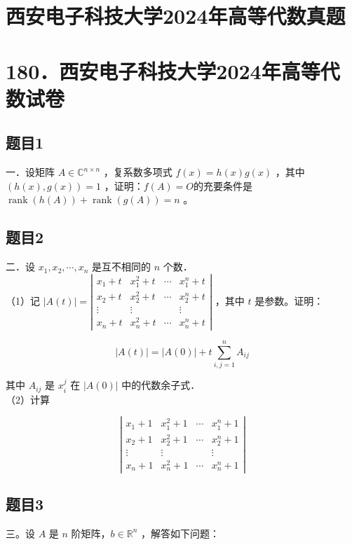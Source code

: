 \documentclass{article}
\begin{document}
\section*{西安电子科技大学2024年高等代数真题}
\section*{180．西安电子科技大学2024年高等代数试卷}

\subsection{题目1}
一．设矩阵 \(A \in \mathbb{C}^{n \times n}\) ，复系数多项式 \(f(x)=h(x) g(x)\) ，其中 \((h(x), g(x))=1\) ，证明：\(f(A)=O\)的充要条件是 \(\operatorname{rank}(h(A))+\operatorname{rank}(g(A))=n\) 。

\subsection{题目2}
二．设 \(x_{1}, x_{2}, \cdots, x_{n}\) 是互不相同的 \(n\) 个数．\\
（1）记 \(|A(t)|=\left|\begin{array}{cccc}x_{1}+t & x_{1}^{2}+t & \cdots & x_{1}^{n}+t \\ x_{2}+t & x_{2}^{2}+t & \cdots & x_{2}^{n}+t \\ \vdots & \vdots & & \vdots \\ x_{n}+t & x_{n}^{2}+t & \cdots & x_{n}^{n}+t\end{array}\right|\) ，其中 \(t\) 是参数。证明：

\[
|A(t)|=|A(0)|+t \sum_{i, j=1}^{n} A_{i j}
\]

其中 \(A_{i j}\) 是 \(x_{i}^{j}\) 在 \(|A(0)|\) 中的代数余子式．\\
（2）计算

\[
\left|\begin{array}{cccc}
x_{1}+1 & x_{1}^{2}+1 & \cdots & x_{1}^{n}+1 \\
x_{2}+1 & x_{2}^{2}+1 & \cdots & x_{2}^{n}+1 \\
\vdots & \vdots & & \vdots \\
x_{n}+1 & x_{n}^{2}+1 & \cdots & x_{n}^{n}+1
\end{array}\right|
\]

\subsection{题目3}
三。设 \(A\) 是 \(n\) 阶矩阵，\(b \in \mathbb{R}^{n}\) ，解答如下问题：
\end{document}
